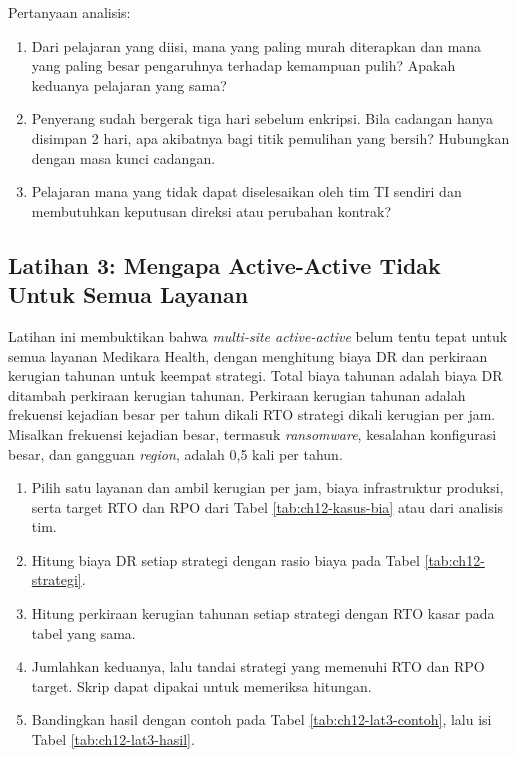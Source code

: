Pertanyaan analisis:
\begin{enumerate}
  \item Dari pelajaran yang diisi, mana yang paling murah diterapkan dan mana yang paling besar
        pengaruhnya terhadap kemampuan pulih? Apakah keduanya pelajaran yang sama?
  \item Penyerang sudah bergerak tiga hari sebelum enkripsi. Bila cadangan hanya disimpan 2 hari,
        apa akibatnya bagi titik pemulihan yang bersih? Hubungkan dengan masa kunci cadangan.
  \item Pelajaran mana yang tidak dapat diselesaikan oleh tim TI sendiri dan membutuhkan keputusan
        direksi atau perubahan kontrak?
\end{enumerate}

\subsection*{Latihan 3: Mengapa Active-Active Tidak Untuk Semua Layanan}

Latihan ini membuktikan bahwa \textit{multi-site active-active} belum tentu tepat untuk semua layanan
Medikara Health, dengan menghitung biaya DR dan perkiraan kerugian tahunan untuk keempat strategi.
Total biaya tahunan adalah biaya DR ditambah perkiraan kerugian tahunan. Perkiraan kerugian
tahunan adalah frekuensi kejadian besar per tahun dikali RTO strategi dikali kerugian per jam.
Misalkan frekuensi kejadian besar, termasuk \textit{ransomware}, kesalahan konfigurasi besar, dan
gangguan \textit{region}, adalah 0,5 kali per tahun.

\begin{enumerate}
  \item Pilih satu layanan dan ambil kerugian per jam, biaya infrastruktur produksi, serta target
        RTO dan RPO dari Tabel \ref{tab:ch12-kasus-bia} atau dari analisis tim.
  \item Hitung biaya DR setiap strategi dengan rasio biaya pada Tabel \ref{tab:ch12-strategi}.
  \item Hitung perkiraan kerugian tahunan setiap strategi dengan RTO kasar pada tabel yang sama.
  \item Jumlahkan keduanya, lalu tandai strategi yang memenuhi RTO dan RPO target. Skrip
         dapat dipakai untuk memeriksa hitungan.
  \item Bandingkan hasil dengan contoh pada Tabel \ref{tab:ch12-lat3-contoh}, lalu isi Tabel
        \ref{tab:ch12-lat3-hasil}.
\end{enumerate}

